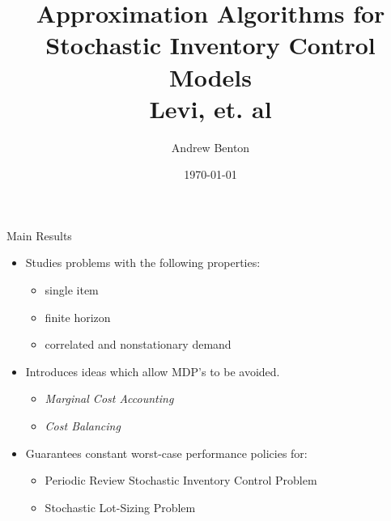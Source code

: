 \documentclass{beamer}
\title{Approximation Algorithms for Stochastic Inventory Control Models \\
    Levi, et. al
}
\author{Andrew Benton}
\date{\today}
\begin{document}
\begin{frame}[plain]
\maketitle
\end{frame}

\begin{frame}{Main Results}{}
    \begin{itemize}
    \item Studies problems with the following properties:
        \begin{itemize} 
            \item single item
            \item finite horizon
            \item correlated and nonstationary demand
        \end{itemize}
    \item Introduces ideas which allow MDP's to be avoided.
        \begin{itemize}
            \item \textit{Marginal Cost Accounting}
            \item \textit{Cost Balancing}
        \end{itemize}
    \item Guarantees constant worst-case performance policies for: 
        \begin{itemize}
            \item Periodic Review Stochastic Inventory Control Problem
            \item Stochastic Lot-Sizing Problem 
        \end{itemize}
    \end{itemize}
\end{frame}
\end{document}
